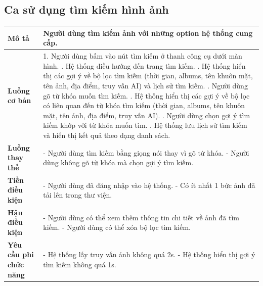 \subsection{Ca sử dụng tìm kiếm hình ảnh}

\vspace{0.5cm}

\noindent 
\begin{tabularx}{\linewidth}{| l | X |} 
\hline 
\textbf{Mô tả} & Người dùng tìm kiếm ảnh với những option hệ thống cung cấp. \\
\hline 
\textbf{Luồng cơ bản} & 1. Người dùng bấm vào nút tìm kiếm ở thanh công cụ dưới màn hình. \newline
                       2. Hệ thống điều hướng đến trang tìm kiếm. \newline
                       3. Hệ thống hiển thị các gợi ý về bộ lọc tìm kiếm (thời gian, albums, tên khuôn mặt, tên ảnh, địa điểm, truy vấn AI) và lịch sử tìm kiếm. \newline
                       4. Người dùng gõ từ khóa muốn tìm kiếm. \newline
                       5. Hệ thống hiển thị các gợi ý về bộ lọc có liên quan đến từ khóa tìm kiếm (thời gian, albums, tên khuôn mặt, tên ảnh, địa điểm, truy vấn AI). \newline
                       6. Người dùng chọn gợi ý tìm kiếm khớp với từ khóa muốn tìm. \newline
                       7. Hệ thống lưu lịch sử tìm kiếm và hiển thị kết quả theo dạng danh sách. \\
\hline
\textbf{Luồng thay thế} & - Người dùng tìm kiếm bằng giọng nói thay vì gõ từ khóa. \newline
                           - Người dùng không gõ từ khóa mà chọn gợi ý tìm kiếm. \\
\hline
\textbf{Tiền điều kiện} & - Người dùng đã đăng nhập vào hệ thống. \newline
                          - Có ít nhất 1 bức ảnh đã tải lên trong thư viện. \\
\hline
\textbf{Hậu điều kiện} & - Người dùng có thể xem thêm thông tin chi tiết về ảnh đã tìm kiếm. \newline
                          - Người dùng có thể xóa bộ lọc tìm kiếm. \\
\hline 
\textbf{Yêu cầu phi chức năng} & - Hệ thống lấy truy vấn ảnh không quá 2s. \newline
                            - Hệ thống hiển thị gợi ý tìm kiếm không quá 1s. \\
\hline 
\end{tabularx}

